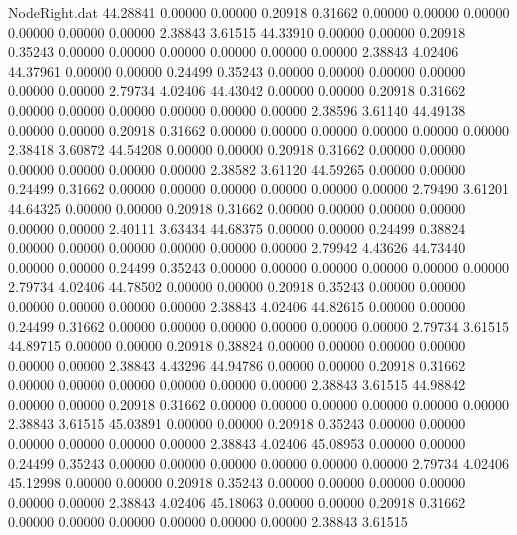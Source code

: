 \begin{filecontents}{NodeRight.dat}
  44.28841    0.00000    0.00000     0.20918    0.31662    0.00000    0.00000    0.00000    0.00000    0.00000    0.00000    2.38843    3.61515
  44.33910    0.00000    0.00000     0.20918    0.35243    0.00000    0.00000    0.00000    0.00000    0.00000    0.00000    2.38843    4.02406
  44.37961    0.00000    0.00000     0.24499    0.35243    0.00000    0.00000    0.00000    0.00000    0.00000    0.00000    2.79734    4.02406
  44.43042    0.00000    0.00000     0.20918    0.31662    0.00000    0.00000    0.00000    0.00000    0.00000    0.00000    2.38596    3.61140
  44.49138    0.00000    0.00000     0.20918    0.31662    0.00000    0.00000    0.00000    0.00000    0.00000    0.00000    2.38418    3.60872
  44.54208    0.00000    0.00000     0.20918    0.31662    0.00000    0.00000    0.00000    0.00000    0.00000    0.00000    2.38582    3.61120
  44.59265    0.00000    0.00000     0.24499    0.31662    0.00000    0.00000    0.00000    0.00000    0.00000    0.00000    2.79490    3.61201
  44.64325    0.00000    0.00000     0.20918    0.31662    0.00000    0.00000    0.00000    0.00000    0.00000    0.00000    2.40111    3.63434
  44.68375    0.00000    0.00000     0.24499    0.38824    0.00000    0.00000    0.00000    0.00000    0.00000    0.00000    2.79942    4.43626
  44.73440    0.00000    0.00000     0.24499    0.35243    0.00000    0.00000    0.00000    0.00000    0.00000    0.00000    2.79734    4.02406
  44.78502    0.00000    0.00000     0.20918    0.35243    0.00000    0.00000    0.00000    0.00000    0.00000    0.00000    2.38843    4.02406
  44.82615    0.00000    0.00000     0.24499    0.31662    0.00000    0.00000    0.00000    0.00000    0.00000    0.00000    2.79734    3.61515
  44.89715    0.00000    0.00000     0.20918    0.38824    0.00000    0.00000    0.00000    0.00000    0.00000    0.00000    2.38843    4.43296
  44.94786    0.00000    0.00000     0.20918    0.31662    0.00000    0.00000    0.00000    0.00000    0.00000    0.00000    2.38843    3.61515
  44.98842    0.00000    0.00000     0.20918    0.31662    0.00000    0.00000    0.00000    0.00000    0.00000    0.00000    2.38843    3.61515
  45.03891    0.00000    0.00000     0.20918    0.35243    0.00000    0.00000    0.00000    0.00000    0.00000    0.00000    2.38843    4.02406
  45.08953    0.00000    0.00000     0.24499    0.35243    0.00000    0.00000    0.00000    0.00000    0.00000    0.00000    2.79734    4.02406
  45.12998    0.00000    0.00000     0.20918    0.35243    0.00000    0.00000    0.00000    0.00000    0.00000    0.00000    2.38843    4.02406
  45.18063    0.00000    0.00000     0.20918    0.31662    0.00000    0.00000    0.00000    0.00000    0.00000    0.00000    2.38843    3.61515

\end{filecontents}
